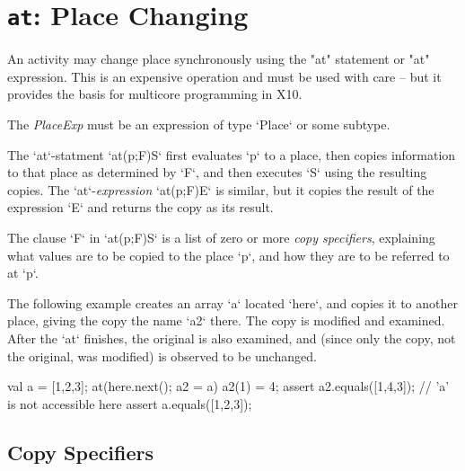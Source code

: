 \section{ {\tt at}: Place Changing}\label{AtStatement}

An activity may change place synchronously using the \xcd"at" statement or
\xcd"at" expression. This is an expensive operation and must be used
with care -- but it provides the basis for multicore programming in X10.

\begin{bbgrammar}
\end{bbgrammar}

The {\it PlaceExp} must be an expression of type \xcd`Place` or some subtype.

The \xcd`at`-statment \xcd`at(p;F)S` first evaluates \xcd`p` to a place, then
copies information to that place as determined by \xcd`F`, and then executes
\xcd`S` using the resulting copies.  The \xcd`at`-{\em expression}
\xcd`at(p;F)E` is similar, but it copies the result of the expression \xcd`E`
and returns the copy as its result.

The clause \xcd`F` in \xcd`at(p;F)S` is a list of zero or more {\em copy
specifiers}, explaining what values are to be copied to the place \xcd`p`, and
how they are to be referred to at \xcd`p`.  

\begin{ex}
The following example creates an array \xcd`a` located \xcd`here`, and copies
it to another place, giving the copy the name \xcd`a2` there.  The copy is
modified and examined.  After the \xcd`at` finishes, the original is also
examined, and (since only the copy, not the original, was modified) is observed
to be unchanged. 
\begin{xten}
val a = [1,2,3];
at(here.next(); a2 = a) {
  a2(1) = 4;
  assert a2.equals([1,4,3]);
  // 'a' is not accessible here
}
assert a.equals([1,2,3]);
\end{xten}
\end{ex}

\subsection{Copy Specifiers}
\label{sect:copy-spec}

